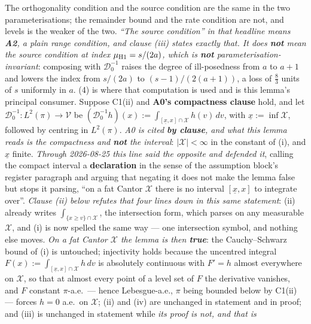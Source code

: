 \begin{lemma}\label{lem:levels}
The orthogonality condition and the source condition are the same in the two parameterisations; the
remainder bound and the rate condition are not, and levels is the weaker of the two.
\emph{``The source condition'' in that headline means \textbf{A2}, a plain range condition, and clause
\textup{(iii)} states exactly that. It does \textbf{not} mean the source condition \emph{at index
$\mu_{\text{\textup{H1}}}=s/(2a)$},
which is \textbf{not} parameterisation-invariant}: composing with $\mathcal D^{-1}_0$ raises the degree of
ill-posedness from $a$ to $a+1$ and lowers the index from $s/(2a)$ to $(s-1)/(2(a+1))$, a loss of
$\tfrac83$ units of $s$ uniformly in $a$. \textup{(4)} is where that computation is used
and is this lemma's principal consumer.
Suppose C1(ii) and \textbf{A0's compactness clause} hold, and let
$\mathcal D^{-1}_0:L^{2}(\pi)\to\mathcal V$ be
$(\mathcal D^{-1}_0h)(x):=\int_{[\underline x,x]\cap\mathcal X}h(v)\,dv$, with
$\underline x:=\inf\mathcal X$, followed by centring in $L^{2}(\pi)$.
\emph{A0 is cited \textbf{by clause}, and what this lemma reads is the compactness and \textbf{not} the
interval}: $|\mathcal X|<\infty$ in the constant of \textup{(i)}, and $\underline x$ finite. \emph{Through
2026-08-25 this line said the opposite and defended it}, calling the compact interval a
\textbf{declaration} in the sense of the assumption block's register paragraph and arguing that negating
it does not make the lemma false but stops it parsing, ``on a fat Cantor $\mathcal X$ there is no
interval $[\underline x,x]$ to integrate over''. \emph{Clause \textup{(ii)} below refutes that four lines
down in this same statement}: \textup{(ii)} already writes $\int_{\{x\ge v\}\cap\mathcal X}$, the
intersection form, which parses on any measurable $\mathcal X$, and \textup{(i)} is now spelled the same
way --- one intersection symbol, and nothing else moves. \emph{On a fat Cantor $\mathcal X$ the lemma is
then \textbf{true}}: the Cauchy--Schwarz bound of \textup{(i)} is untouched; injectivity holds because
the uncentred integral $F(x):=\int_{[\underline x,x]\cap\mathcal X}h\,dv$ is absolutely continuous with
$F'=h$ almost everywhere on $\mathcal X$, so that at almost every point of a level set of $F$ the
derivative vanishes, and $F$ constant $\pi$-a.e.\ --- hence Lebesgue-a.e., $\pi$ being bounded below by
C1(ii) --- forces $h=0$ a.e.\ on $\mathcal X$; \textup{(ii)} and \textup{(iv)} are unchanged in statement
and in proof; and \textup{(iii)} is unchanged in statement while \emph{its proof is not, and that is
}
\end{lemma}
